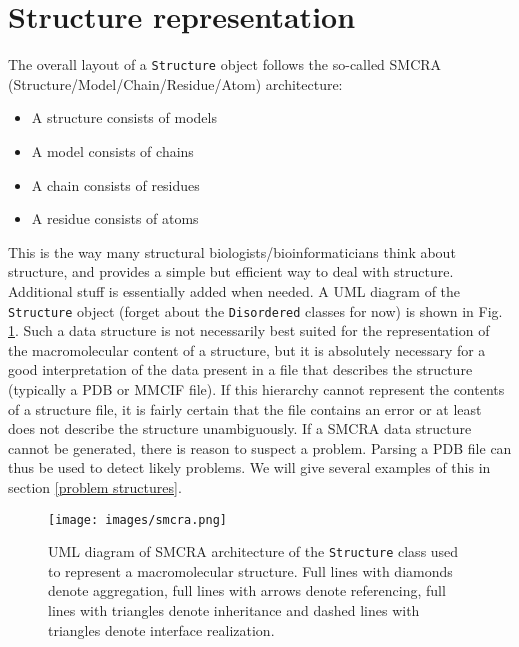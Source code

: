 \documentclass{report}
\begin{document}
\section{Structure representation}

The overall layout of a \texttt{Structure} object follows the so-called SMCRA
(Structure/Model/Chain/Residue/Atom) architecture:

\begin{itemize}
\item A structure consists of models
\item A model consists of chains
\item A chain consists of residues
\item A residue consists of atoms
\end{itemize}
This is the way many structural biologists/bioinformaticians think
about structure, and provides a simple but efficient way to deal with
structure. Additional stuff is essentially added when needed. A UML
diagram of the \texttt{Structure} object (forget about the \texttt{Disordered}
classes for now) is shown in Fig. \ref{fig:smcra}. Such a data structure is not
necessarily best suited for the representation of the macromolecular content of
a structure, but it is absolutely necessary for a good interpretation of the
data present in a file that describes the structure (typically a PDB or MMCIF
file). If this hierarchy cannot represent the contents of a structure file, it
is fairly certain that the file contains an error or at least does not describe
the structure unambiguously. If a SMCRA data structure cannot be generated,
there is reason to suspect a problem. Parsing a PDB file can thus be used to
detect likely problems. We will give several examples of this in section
\ref{problem structures}.

\begin{figure}[htbp]
\begin{htmlonly}
\end{htmlonly}
\begin{latexonly}
\centering
\texttt{[image: images/smcra.png]}
\end{latexonly}
\caption{UML diagram of SMCRA architecture of the \texttt{Structure} class used to represent a macromolecular structure.
Full lines with diamonds denote aggregation, full lines with
arrows denote referencing, full lines with triangles denote inheritance
and dashed lines with triangles denote interface realization.}
\label{fig:smcra}
\end{figure}
\end{document}

